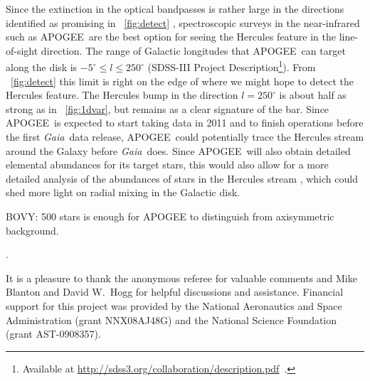 \documentclass[12pt,preprint]{aastex}
\newcommand{\eg}{e.g.}
\newcommand{\Gaia}{\emph{Gaia}}
\newcommand{\apogee}{APOGEE}
\begin{document}
Since the extinction in the optical bandpasses is rather large in the
directions identified as promising in \figurename~\ref{fig:detect}
\citep[$A_V \approx 8$ mag toward $l \approx
  270^{\circ}$;][]{marshall06a}, spectroscopic surveys in the
near-infrared such as \apogee\ are the best option for seeing the
Hercules feature in the line-of-sight direction. The range of Galactic
longitudes that \apogee\ can target along the disk is $-5^{\circ} \leq
l \leq 250^{\circ}$ (SDSS-III Project Description\footnote{Available
  at \url{http://sdss3.org/collaboration/description.pdf}~.}). From
\figurename~\ref{fig:detect} this limit is right on the edge of where
we might hope to detect the Hercules feature. The Hercules bump in the
direction $l = 250^{\circ}$ is about half as strong as in
\figurename~\ref{fig:1dvar}, but remains as a clear signature of the
bar. Since \apogee\ is expected to start taking data in 2011 and to
finish operations before the first \Gaia\ data release, \apogee\ could
potentially trace the Hercules stream around the Galaxy before
\Gaia\ does. Since \apogee\ will also obtain detailed elemental
abundances for its target stars, this would also allow for a more
detailed analysis of the abundances of stars in the Hercules stream
\citep[following, \eg,][]{Bensby07a,Bovy10a}, which could shed more
light on radial mixing in the Galactic disk.

BOVY: 500 stars is enough for APOGEE to distinguish from axisymmetric
background.

\citep{Freeman10a}.

\acknowledgements It is a pleasure to thank the anonymous referee for
valuable comments and Mike Blanton and David W.~Hogg for helpful
discussions and assistance.  Financial support for this project was
provided by the National Aeronautics and Space Administration (grant
NNX08AJ48G) and the National Science Foundation (grant AST-0908357).
\end{document}
